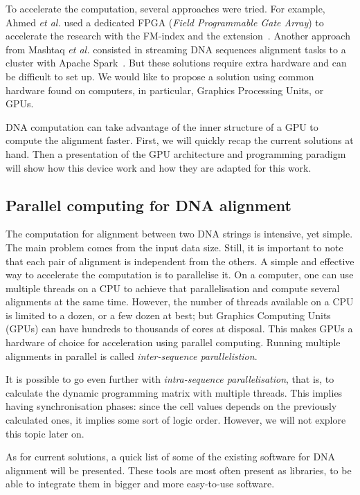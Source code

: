 To accelerate the computation, several approaches were tried. For example, Ahmed \emph{et al.} used a dedicated FPGA (\emph{Field Programmable Gate Array}) to accelerate the research with the FM-index and the extension~\cite{Ahmed:FPGA}. Another approach from Mashtaq \emph{et al.} consisted in streaming DNA sequences alignment tasks to a cluster with Apache Spark~\cite{Mushtaq:spark}. But these solutions require extra hardware and can be difficult to set up. We would like to propose a solution using common hardware found on computers, in particular, Graphics Processing Units, or GPUs.

DNA computation can take advantage of the inner structure of a GPU to compute the alignment faster. First, we will quickly recap the current solutions at hand. Then a presentation of the GPU architecture and programming paradigm will show how this device work and how they are adapted for this work.

\subsection{Parallel computing for DNA alignment}

The computation for alignment between two DNA strings is intensive, yet simple. The main problem comes from the input data size. Still, it is important to note that each pair of alignment is independent from the others. A simple and effective way to accelerate the computation is to parallelise it. On a computer, one can use multiple threads on a CPU to achieve that parallelisation and compute several alignments at the same time. However, the number of threads available on a CPU is limited to a dozen, or a few dozen at best; but Graphics Computing Units (GPUs) can have hundreds to thousands of cores at disposal. This makes GPUs a hardware of choice for acceleration using parallel computing. Running multiple alignments in parallel is called \emph{inter-sequence parallelistion}.

It is possible to go even further with \emph{intra-sequence parallelisation}, that is, to calculate the dynamic programming matrix with multiple threads. This implies having synchronisation phases: since the cell values depends on the previously calculated ones, it implies some sort of logic order. However, we will not explore this topic later on.

As for current solutions, a quick list of some of the existing software for DNA alignment will be presented. These tools are most often present as libraries, to be able to integrate them in bigger and more easy-to-use software.

